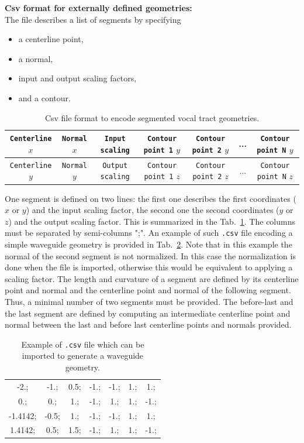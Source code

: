 \documentclass[]{article}
\begin{document}
	\textbf{Csv format for externally defined geometries:}\\
	The file describes a list of segments by specifying
	\begin{itemize}
		\item a centerline point,
		\item a normal,
		\item input and output scaling factors,
		\item and a contour.
	\end{itemize}

	\begin{table}[h!]
		\centering
		\begin{tabular}{c c c c c c c}
			\hline
			\texttt{Centerline} $x$ & \texttt{Normal} $x$ & 
			\texttt{Input scaling} & \texttt{Contour point 1} $y$ &  
			\texttt{Contour point 2} $y$ & ... 
			& \texttt{Contour point N} $y$ \\
			\hline
			\texttt{Centerline} $y$ & \texttt{Normal} $y$ & 
			\texttt{Output scaling} & \texttt{Contour point 1} $z$ &  
			\texttt{Contour point 2} $z$ & ... 
			& \texttt{Contour point N} $z$ \\
			\hline
		\end{tabular}
		\caption{Csv file format to encode segmented vocal tract geometries.}
		\label{table:csv_file_format}
	\end{table}

	One segment is defined on two lines: the first one describes the 
	first coordinates ($x$ or $y$) and the input scaling factor, the second one the second coordinates ($y$ or $z$) and the output scaling factor. 
	This is summarized in the Tab.~\ref{table:csv_file_format}.
	The columns must be separated by semi-columns ";". 
	An example of such \texttt{.csv} file encoding a simple waveguide
	geometry is provided in Tab.~\ref{table:example_csv_file}.
	Note that in this example the normal of the second segment is not normalized.
	In this case the normalization is done when the file is imported, otherwise
	this would be equivalent to applying a scaling factor.
	The length and curvature of a segment are defined by its centerline
	point and normal and the centerline point and normal of the 
	following segment.
	Thus, a minimal number of two segments must be provided. 
	The before-last and the last segment are defined by computing an 
	intermediate centerline point and normal between the last and 
	before last centerline points and normals provided.
	
	\begin{table}[h!]
		\centering
		\begin{tabular}{c c c c c c c }
			-2.;& -1.;& 0.5;& -1.;& -1.;& 1.;& 1.; \\
			0.;& 0.;& 1.;& -1.;& 1.;& 1.;& -1.; \\
			-1.4142;& -0.5;& 1.;& -1.;& -1.;& 1.;& 1.; \\
			1.4142;& 0.5;& 1.5;& -1.;& 1.;& 1.;& -1.; 
		\end{tabular}
		\caption{Example of \texttt{.csv} file which can be imported to generate a waveguide geometry.}
		\label{table:example_csv_file}
	\end{table}
\end{document}

